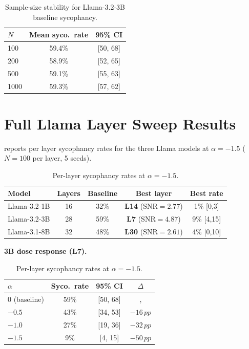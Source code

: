 \documentclass{article}
\newcommand{\snr}{\mathrm{SNR}}
\newcommand{\pp}{\,pp}
\begin{document}
\begin{table}[h]
\centering\small
\caption{Sample-size stability for Llama-3.2-3B baseline sycophancy.}
\label{tab:sample_size_stability}
\begin{tabular}{lcc}
\toprule
$N$ & Mean syco.\ rate & 95\% CI \\
\midrule
100 & 59.4\% & [50, 68] \\
200 & 58.9\% & [52, 65] \\
500 & 59.1\% & [55, 63] \\
1000 & 59.3\% & [57, 62] \\
\bottomrule
\end{tabular}
\end{table}

\section{Full Llama Layer Sweep Results}
\label{app:llama_full}

 reports per layer sycophancy rates for the three
Llama models at $\alpha{=}{-}1.5$ ($N{=}100$ per layer, 5 seeds).

\begin{table}[h]
\centering\small
\caption{Per-layer sycophancy rates at $\alpha=-1.5$.}
\label{tab:llama_full}
\begin{tabular}{lcccc}
\toprule
\textbf{Model} & \textbf{Layers} & \textbf{Baseline} &
 \textbf{Best layer} & \textbf{Best rate} \\
\midrule
Llama-3.2-1B & 16 & 32\% & \textbf{L14} ($\snr{=}2.77$) & 1\% [0,3] \\
Llama-3.2-3B & 28 & 59\% & \textbf{L7} ($\snr{=}4.87$) & 9\% [4,15] \\
Llama-3.1-8B & 32 & 48\% & \textbf{L30} ($\snr{=}2.61$) & 4\% [0,10] \\
\bottomrule
\end{tabular}
\vspace{4pt}

\textbf{3B dose response (L7).}\\[4pt]
\begin{tabular}{lccc}
\toprule
$\alpha$ & Syco.\ rate & 95\% CI & $\Delta$ \\
\midrule
$0$ (baseline) & 59\% & [50, 68] & , \\
$-0.5$ & 43\% & [34, 53] & $-16\pp$ \\
$-1.0$ & 27\% & [19, 36] & $-32\pp$ \\
$-1.5$ & 9\% & [4, 15] & $-50\pp$ \\
\bottomrule
\end{tabular}
\end{table}
\end{document}

